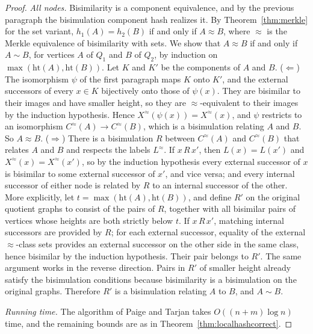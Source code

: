 \documentclass[twoside,leqno]{article}
\newcommand{\hgt}{\mathrm{ht}}
\begin{document}
\begin{proof}
\emph{All nodes.} Bisimilarity is a component equivalence, and by the previous paragraph the bisimulation component hash realizes it. By Theorem~\ref{thm:merkle} for the set variant, $h_1(A)=h_2(B)$ if and only if $A\approx B$, where $\approx$ is the Merkle equivalence of bisimilarity with sets. We show that $A\approx B$ if and only if $A\sim B$, for vertices $A$ of $Q_1$ and $B$ of $Q_2$, by induction on $\max(\hgt(A),\hgt(B))$. Let $K$ and $K'$ be the components of $A$ and $B$. ($\Leftarrow$) The isomorphism $\psi$ of the first paragraph maps $K$ onto $K'$, and the external successors of every $x\in K$ bijectively onto those of $\psi(x)$. They are bisimilar to their images and have smaller height, so they are $\approx$-equivalent to their images by the induction hypothesis. Hence $X^{\approx}(\psi(x))=X^{\approx}(x)$, and $\psi$ restricts to an isomorphism $C^{\approx}(A)\to C^{\approx}(B)$, which is a bisimulation relating $A$ and $B$. So $A\approx B$. ($\Rightarrow$) There is a bisimulation $R$ between $C^{\approx}(A)$ and $C^{\approx}(B)$ that relates $A$ and $B$ and respects the labels $L^{\approx}$. If $x\,R\,x'$, then $L(x)=L(x')$ and $X^{\approx}(x)=X^{\approx}(x')$, so by the induction hypothesis every external successor of $x$ is bisimilar to some external successor of $x'$, and vice versa; and every internal successor of either node is related by $R$ to an internal successor of the other. More explicitly, let $t=\max(\hgt(A),\hgt(B))$, and define $R'$ on the original quotient graphs to consist of the pairs of $R$, together with all bisimilar pairs of vertices whose heights are both strictly below $t$. If $x\,R\,x'$, matching internal successors are provided by $R$; for each external successor, equality of the external $\approx$-class sets provides an external successor on the other side in the same class, hence bisimilar by the induction hypothesis. Their pair belongs to $R'$. The same argument works in the reverse direction. Pairs in $R'$ of smaller height already satisfy the bisimulation conditions because bisimilarity is a bisimulation on the original graphs. Therefore $R'$ is a bisimulation relating $A$ to $B$, and $A\sim B$.

\emph{Running time.} The algorithm of Paige and Tarjan takes $O((n+m)\log n)$ time, and the remaining bounds are as in Theorem~\ref{thm:localhashcorrect}.
\end{proof}
\end{document}
